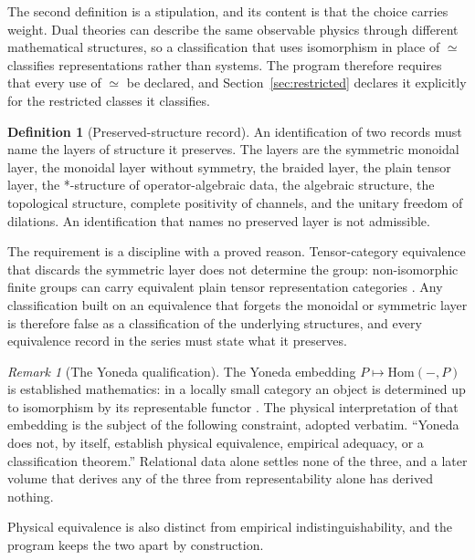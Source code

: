 \documentclass[11pt,letterpaper]{article}
\theoremstyle{definition}
\newtheorem{definition}[theorem]{Definition}
\theoremstyle{remark}
\newtheorem{remark}[theorem]{Remark}
\begin{document}
The second definition is a stipulation, and its content is that the choice carries weight. Dual theories can describe the same observable physics through different mathematical structures, so a classification that uses isomorphism in place of $\simeq$ classifies representations rather than systems. The program therefore requires that every use of $\simeq$ be declared, and Section~\ref{sec:restricted} declares it explicitly for the restricted classes it classifies.

\begin{definition}[Preserved-structure record]
\label{def:preserved-structure}
An identification of two records must name the layers of structure it preserves. The layers are the symmetric monoidal layer, the monoidal layer without symmetry, the braided layer, the plain tensor layer, the *-structure of operator-algebraic data, the algebraic structure, the topological structure, complete positivity of channels, and the unitary freedom of dilations. An identification that names no preserved layer is not admissible.
\end{definition}

The requirement is a discipline with a proved reason. Tensor-category equivalence that discards the symmetric layer does not determine the group: non-isomorphic finite groups can carry equivalent plain tensor representation categories \cite{etingof-gelaki}. Any classification built on an equivalence that forgets the monoidal or symmetric layer is therefore false as a classification of the underlying structures, and every equivalence record in the series must state what it preserves.

\begin{remark}[The Yoneda qualification]
\label{rem:yoneda}
The Yoneda embedding $P \mapsto \mathrm{Hom}(-, P)$ is established mathematics: in a locally small category an object is determined up to isomorphism by its representable functor \cite{maclane1971}. The physical interpretation of that embedding is the subject of the following constraint, adopted verbatim. ``Yoneda does not, by itself, establish physical equivalence, empirical adequacy, or a classification theorem.'' Relational data alone settles none of the three, and a later volume that derives any of the three from representability alone has derived nothing.
\end{remark}

Physical equivalence is also distinct from empirical indistinguishability, and the program keeps the two apart by construction.
\end{document}
